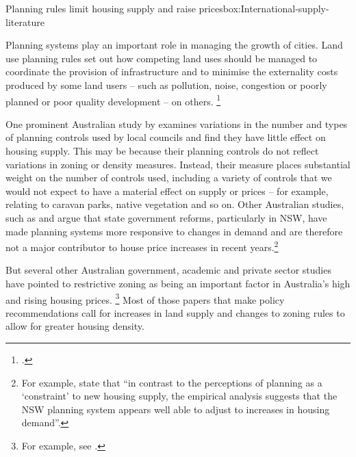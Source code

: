 \begin{bigbox}{Planning rules limit housing supply and raise prices}{box:International-supply-literature}

Planning systems play an important role in managing the growth of cities. Land use planning rules set out how competing land uses should be managed to coordinate the provision of infrastructure and to minimise the externality costs produced by some land users -- such as pollution, noise, congestion or poorly planned or poor quality development -- on others.%
    \footcites[][3]{PC-2017-shifting-dial-potential-of-land}[][85]{Gurran_Bramley_2017_urban_planning_housing_market}

One prominent Australian study by %
    \textcite{OngEtAl-AHURI-2017-Housing-supply-responsiveness} %
examines variations in the number and types of planning controls used by local councils and find they have little effect on housing supply. This may be because their planning controls do not reflect variations in zoning or density measures.  Instead, their measure places substantial weight on the number of controls used, including a variety of controls that we would not expect to have a material effect on supply or prices -- for example, relating to caravan parks, native vegetation and so on. Other Australian studies, such as \textcite{Gurran_Bramley_2017_urban_planning_housing_market} and \textcite{Gurran_Phibbs_2016_boulevard} argue that state government reforms, particularly in NSW, have made planning systems more responsive to changes in demand and are therefore not a major contributor to house price increases in recent years.\footnote{For example, \textcite[][]{Gurran_Phibbs_2016_boulevard} state that ``in contrast to the perceptions of planning as a `constraint' to new housing supply, the empirical analysis suggests that the NSW planning system appears well able to adjust to increases in housing demand''.}

But several other Australian government, academic and private sector studies have pointed to restrictive zoning as being an important factor in Australia's high and rising housing prices.%
    \footnote{For example, see  \textcites{Kendall_Tulip_2018_zoning}{OECD-2010-Economic-Survey-Australia}{KulishRichardsGillitzer2011}{PC2011PerformanceBenchmark}{PC-2017-shifting-dial}.}
Most of those papers that make policy recommendations call for increases in land supply and changes to zoning rules to allow for greater housing density.


\end{bigbox}
